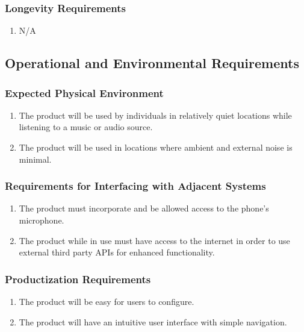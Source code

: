 \documentclass[]{article}
\begin{document}
\subsubsection{Longevity Requirements}
\label{ssub:longevity_requirements}
\begin{enumerate}[{PR}1. ]
	\item N/A
\end{enumerate}


\subsection{Operational and Environmental Requirements}
\label{sub:operational_and_environmental_requirements}

\subsubsection{Expected Physical Environment}
\label{ssub:expected_physical_environment}
\begin{enumerate}[{OE}1. ]
	\item  The product will be used by individuals in relatively quiet locations while listening to a music or audio source.
	\item The product will be used in locations where ambient and external noise is minimal.

\end{enumerate}

\subsubsection{Requirements for Interfacing with Adjacent Systems}
\label{ssub:requirements_for_interfacing_with_adjacent_systems}
\begin{enumerate}[{OE}1. ]
	\item The product must incorporate and be allowed access to the phone’s microphone.
	\item The product while in use must have access to the internet in order to use external third party APIs for enhanced functionality.

\end{enumerate}

\subsubsection{Productization Requirements}
\label{ssub:productization_requirements}
\begin{enumerate}[{OE}1. ]
	\item The product will be easy for users to configure.
	\item The product will have an intuitive user interface with simple navigation.
\end{enumerate}
\end{document}
